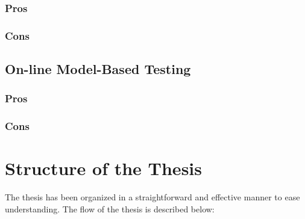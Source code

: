 \subsubsection{Pros}
\subsubsection{Cons}
\subsection{On-line Model-Based Testing}
\subsubsection{Pros}
\subsubsection{Cons}

\section{Structure of the Thesis}
The thesis has been organized in a straightforward and effective manner to ease understanding. The flow of the thesis is described below:

